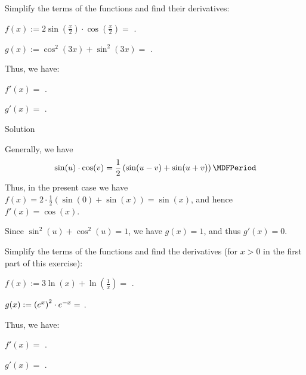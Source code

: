 \begin{MExercises}
\begin{MExercise}
Simplify the terms of the functions and find their derivatives:
\begin{MExerciseItems}
\item
 $f(x) := 2 \sin\left(\frac{x}{2}\right) \cdot \cos\left(\frac{x}{2}\right) = $ %
.
\item $g(x) := \cos^2(3 x) + \sin^2(3 x) = $ %
.
\end{MExerciseItems}
Thus, we have:
\begin{MExerciseItems}
\item $f'(x) = $ .
\item $g'(x) = $ .
\end{MExerciseItems}
\begin{MHint}{Solution}
 \begin{MExerciseItems}
  \item Generally, we have
  \[
   \sin (u) \cdot \cos (v) = \frac12 \left( \sin (u-v) + \sin (u+v) \right) \MDFPeriod
  \]
  Thus, in the present case we have $f(x) = 2 \cdot \frac12 ( \sin(0) + \sin(x) ) = \sin (x)$, 
  and hence $f'(x) =  \cos (x)$.
  \item Since $\sin^2 (u) + \cos^2 (u) = 1$, we have $g(x) = 1$, and thus $g'(x) = 0$.
 \end{MExerciseItems}
\end{MHint}
\end{MExercise}

\begin{MExercise}
Simplify the terms of the functions and find the derivatives
(for $x > 0$ in the first part of this exercise):
\begin{MExerciseItems}
\item $f(x) := 3 \ln(x) + \ln\left(\frac{1}{x}\right) = $
.
\item $g(x) := \left(e^x\right)^2 \cdot e^{-x} = $
.
\end{MExerciseItems}
Thus, we have:
\begin{MExerciseItems}
\item $f'(x) = $ .
\item $g'(x) = $ .
\end{MExerciseItems}


\end{MExercise}
\end{MExercises}
